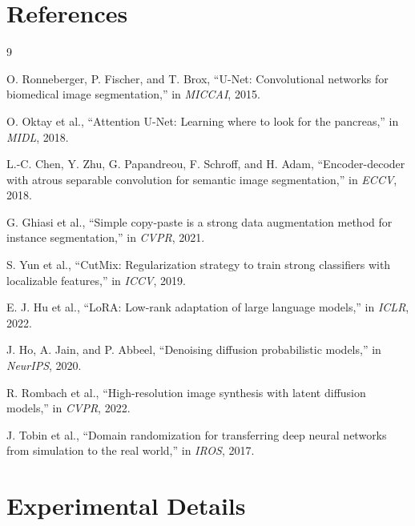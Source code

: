 \documentclass[12pt,a4paper]{article}
\begin{document}
\section*{References}
\begin{thebibliography}{9}

O. Ronneberger, P. Fischer, and T. Brox, ``U-Net: Convolutional networks for biomedical image segmentation,'' in \textit{MICCAI}, 2015.

O. Oktay et al., ``Attention U-Net: Learning where to look for the pancreas,'' in \textit{MIDL}, 2018.

L.-C. Chen, Y. Zhu, G. Papandreou, F. Schroff, and H. Adam, ``Encoder-decoder with atrous separable convolution for semantic image segmentation,'' in \textit{ECCV}, 2018.

G. Ghiasi et al., ``Simple copy-paste is a strong data augmentation method for instance segmentation,'' in \textit{CVPR}, 2021.

S. Yun et al., ``CutMix: Regularization strategy to train strong classifiers with localizable features,'' in \textit{ICCV}, 2019.

E. J. Hu et al., ``LoRA: Low-rank adaptation of large language models,'' in \textit{ICLR}, 2022.

J. Ho, A. Jain, and P. Abbeel, ``Denoising diffusion probabilistic models,'' in \textit{NeurIPS}, 2020.

R. Rombach et al., ``High-resolution image synthesis with latent diffusion models,'' in \textit{CVPR}, 2022.

J. Tobin et al., ``Domain randomization for transferring deep neural networks from simulation to the real world,'' in \textit{IROS}, 2017.

\end{thebibliography}

\appendix
\section{Experimental Details}
\end{document}
